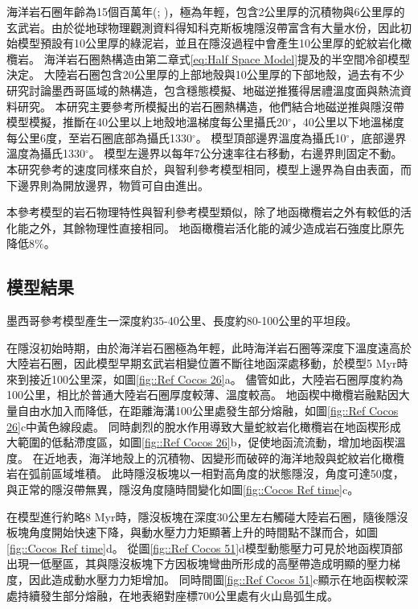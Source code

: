海洋岩石圈年齡為15個百萬年(\citealp{Manea2011Thermal}; \citealp{muller2019})，極為年輕，包含2公里厚的沉積物與6公里厚的玄武岩。由於從地球物理觀測資料得知科克斯板塊隱沒帶富含有大量水份，因此初始模型預設有10公里厚的綠泥岩，並且在隱沒過程中會產生10公里厚的蛇紋岩化橄欖岩。
海洋岩石圈熱構造由第二章式\ref{eq:Half Space Model}提及的半空間冷卻模型決定。
大陸岩石圈包含20公里厚的上部地殼與10公里厚的下部地殼，過去有不少研究討論墨西哥區域的熱構造，包含穩態模擬、地磁逆推獲得居禮溫度面與熱流資料研究。
本研究主要參考\citealp{Manea2011Curie}所模擬出的岩石圈熱構造，他們結合地磁逆推與隱沒帶模型模擬，推斷在40公里以上地殼地溫梯度每公里攝氏20$^{\circ}$，40公里以下地溫梯度每公里6度，至岩石圈底部為攝氏1330$^{\circ}$。
模型頂部邊界溫度為攝氏10$^{\circ}$，底部邊界溫度為攝氏1330$^{\circ}$。
模型左邊界以每年7公分速率往右移動，右邊界則固定不動。
本研究參考的速度同樣來自於\citealp{o2005uncertainties}，與智利參考模型相同，模型上邊界為自由表面，而下邊界則為開放邊界，物質可自由進出。

本參考模型的岩石物理特性與智利參考模型類似，除了地函橄欖岩之外有較低的活化能之外，其餘物理性直接相同。
地函橄欖岩活化能的減少造成岩石強度比原先降低8$\%$。


\subsection{模型結果}\label{墨西哥參考模型結果}
墨西哥參考模型產生一深度約35-40公里、長度約80-100公里的平坦段。

在隱沒初始時期，由於海洋岩石圈極為年輕，此時海洋岩石圈等深度下溫度遠高於大陸岩石圈，因此模型早期玄武岩相變位置不斷往地函深處移動，於模型5 Myr時來到接近100公里深，如圖\ref{fig::Ref Cocos 26}a。
儘管如此，大陸岩石圈厚度約為100公里，相比於普通大陸岩石圈厚度較薄、溫度較高。
地函楔中橄欖岩融點因大量自由水加入而降低，在距離海溝100公里處發生部分熔融，如圖\ref{fig::Ref Cocos 26}c中黃色線段處。
同時劇烈的脫水作用導致大量蛇紋岩化橄欖岩在地函楔形成大範圍的低黏滯度區，如圖\ref{fig::Ref Cocos 26}b，促使地函流流動，增加地函楔溫度。
在近地表，海洋地殼上的沉積物、因變形而破碎的海洋地殼與蛇紋岩化橄欖岩在弧前區域堆積。
此時隱沒板塊以一相對高角度的狀態隱沒，角度可達50度，與正常的隱沒帶無異，隱沒角度隨時間變化如圖\ref{fig::Cocos Ref time}c。

在模型進行約略8 Myr時，隱沒板塊在深度30公里左右觸碰大陸岩石圈，隨後隱沒板塊角度開始快速下降，與動水壓力力矩顯著上升的時間點不謀而合，如圖\ref{fig::Cocos Ref time}d。
從圖\ref{fig::Ref Cocos 51}d模型動態壓力可見於地函楔頂部出現一低壓區，其與隱沒板塊下方因板塊彎曲所形成的高壓帶造成明顯的壓力梯度，因此造成動水壓力力矩增加。
同時間圖\ref{fig::Ref Cocos 51}c顯示在地函楔較深處持續發生部分熔融，在地表絕對座標700公里處有火山島弧生成。

